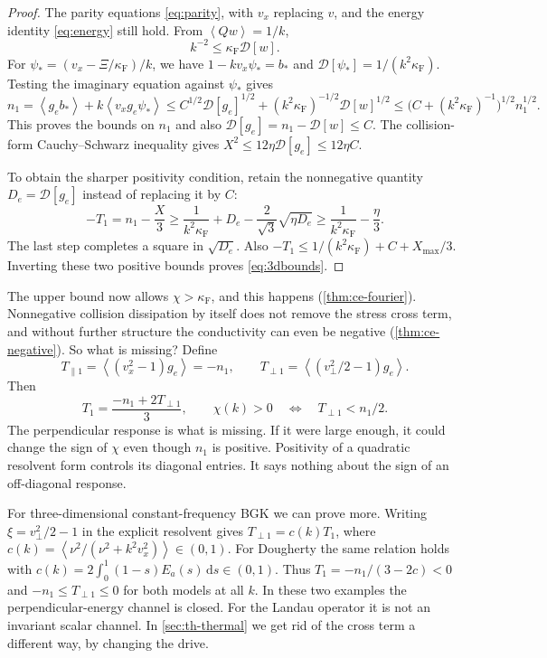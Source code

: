 \documentclass[11pt]{article}
\newcommand{\dd}{\,\mathrm d}
\newcommand{\av}[1]{\left\langle #1\right\rangle}
\newcommand{\D}{\mathcal D}
\newcommand{\F}{\kappa_{\mathrm F}}
\theoremstyle{definition}
\theoremstyle{remark}
\numberwithin{equation}{section}
\begin{document}
\begin{proof}
The parity equations \eqref{eq:parity}, with $v_x$ replacing $v$, and
the energy identity \eqref{eq:energy} still hold. From
$\av{Qw}=1/k$,
\[
 k^{-2}\leq\F\D[w].
\]
For $\psi_*=(v_x-\Xi/\F)/k$, we have
$1-kv_x\psi_*=b_*$ and $\D[\psi_*]=1/(k^2\F)$.
Testing the imaginary equation against $\psi_*$ gives
\[
 n_1=\av{g_eb_*}+k\av{v_xg_e\psi_*}
 \leq C^{1/2}\D[g_e]^{1/2}
        +(k^2\F)^{-1/2}\D[w]^{1/2}
 \leq \bigl(C+(k^2\F)^{-1}\bigr)^{1/2}n_1^{1/2}.
\]
This proves the bounds on $n_1$ and also
$\D[g_e]=n_1-\D[w]\leq C$.
The collision-form Cauchy--Schwarz inequality gives
$X^2\leq12\eta\D[g_e]\leq12\eta C$.

To obtain the sharper positivity condition, retain the nonnegative
quantity $D_e=\D[g_e]$ instead of replacing it by $C$:
\[
 -T_1=n_1-\frac X3
 \geq\frac1{k^2\F}+D_e-\frac2{\sqrt3}\sqrt{\eta D_e}
 \geq\frac1{k^2\F}-\frac{\eta}{3}.
\]
The last step completes a square in $\sqrt{D_e}$.
Also $-T_1\leq1/(k^2\F)+C+X_{\max}/3$.
Inverting these two positive bounds proves \eqref{eq:3dbounds}.
\end{proof}

The upper bound now allows $\chi>\F$, and this happens
(\cref{thm:ce-fourier}). Nonnegative collision
dissipation by itself does not remove the stress cross term, and without
further structure the conductivity can even be negative
(\cref{thm:ce-negative}).
So what is missing? Define
\[
 T_{\parallel1}=\av{(v_x^2-1)g_e}=-n_1,\qquad
 T_{\perp1}=\av{(v_\perp^2/2-1)g_e}.
\]
Then
\begin{equation}
 T_1=\frac{-n_1+2T_{\perp1}}3,\qquad
 \chi(k)>0\quad\Longleftrightarrow\quad T_{\perp1}<n_1/2.
 \label{eq:perptest}
\end{equation}
The perpendicular response is what is missing. If it were large enough,
it could change the sign of $\chi$ even though $n_1$ is positive.
Positivity of a quadratic resolvent form controls its diagonal entries.
It says nothing about the sign of an off-diagonal response.

For three-dimensional constant-frequency BGK we can prove more.
Writing $\xi=v_\perp^2/2-1$ in the explicit resolvent gives
$T_{\perp1}=c(k)T_1$, where
$c(k)=\av{\nu^2/(\nu^2+k^2v_x^2)}\in(0,1)$.
For Dougherty the same relation holds with
$c(k)=2\int_0^1(1-s)E_a(s)\dd s\in(0,1)$.
Thus $T_1=-n_1/(3-2c)<0$ and
$-n_1\leq T_{\perp1}\leq0$ for both models at all $k$.
In these two examples the perpendicular-energy channel is closed.
For the Landau operator it is not an invariant scalar channel.
In \cref{sec:th-thermal} we get rid of the cross term a different way,
by changing the drive.
\end{document}
